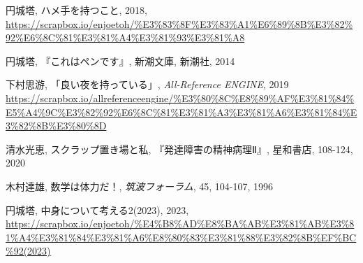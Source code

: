 \documentclass[10pt, a5paper, twoside]{jsarticle}
\theoremstyle{definition}
\begin{document}
	\begin{thebibliography}{99}

		 円城塔, ハメ手を持つこと, 2018, \url{https://scrapbox.io/enjoetoh/%E3%83%8F%E3%83%A1%E6%89%8B%E3%82%92%E6%8C%81%E3%81%A4%E3%81%93%E3%81%A8}

		 円城塔, 『これはペンです』, 新潮文庫, 新潮社, 2014

		 下村思游, 「良い夜を持っている」, \textit{All-Reference ENGINE}, 2019 \url{https://scrapbox.io/allreferenceengine/%E3%80%8C%E8%89%AF%E3%81%84%E5%A4%9C%E3%82%92%E6%8C%81%E3%81%A3%E3%81%A6%E3%81%84%E3%82%8B%E3%80%8D}

		 清水光恵, スクラップ置き場と私, 『発達障害の精神病理Ⅱ』, 星和書店, 108-124, 2020

		 木村達雄, 数学は体力だ！, \textit{筑波フォーラム}, 45, 104-107, 1996

		 円城塔, 中身について考える2(2023), 2023, \url{https://scrapbox.io/enjoetoh/%E4%B8%AD%E8%BA%AB%E3%81%AB%E3%81%A4%E3%81%84%E3%81%A6%E8%80%83%E3%81%88%E3%82%8B%EF%BC%92(2023)}

	\end{thebibliography}
\end{document}
